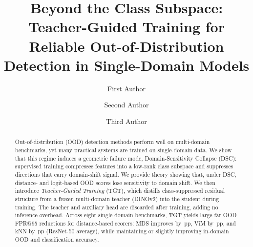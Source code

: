 \documentclass[runningheads]{llncs}
\begin{document}
\title{Beyond the Class Subspace: Teacher-Guided Training for Reliable Out-of-Distribution Detection in Single-Domain Models}

\author{First Author \and
Second Author \and
Third Author}


\maketitle

\begin{abstract}
Out-of-distribution (OOD) detection methods perform well on multi-domain benchmarks, yet many practical systems are trained on single-domain data. We show that this regime induces a geometric failure mode, Domain-Sensitivity Collapse (DSC): supervised training compresses features into a low-rank class subspace and suppresses directions that carry domain-shift signal. We provide theory showing that, under DSC, distance- and logit-based OOD scores lose sensitivity to domain shift. We then introduce \emph{Teacher-Guided Training} (TGT), which distills class-suppressed residual structure from a frozen multi-domain teacher (DINOv2) into the student during training. The teacher and auxiliary head are discarded after training, adding no inference overhead. Across eight single-domain benchmarks, TGT yields large far-OOD FPR@95 reductions for distance-based scorers: MDS improves by \FaroodMDSImprovementPPResNet{}\,pp, ViM by \FaroodViMImprovementPPResNet{}\,pp, and kNN by \FaroodKnnImprovementPPResNet{}\,pp (ResNet-50 average), while maintaining or slightly improving in-domain OOD and classification accuracy.
\end{abstract}


\end{document}
